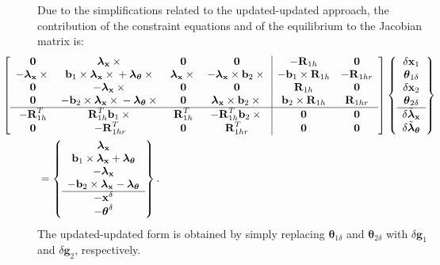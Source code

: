 \documentclass[10pt,dvips,fleqn,subeqn]{report}
\newcommand{\T}[1]{\bm{\mathbf{#1}}}
\begin{document}
Due to the simplifications related to the updated-updated approach,
the contribution of the constraint equations and of the equilibrium 
to the Jacobian matrix is: 
\begin{align}
	\small
	&\hspace{-12mm}%
	\sqbr{\matr{cccc|cc}{
	\T{0} & 
	\T{\lambda}_{\T{x}}\times{} & 
	\T{0} & 
	\T{0} & 
	-\T{R}_{1h} &
	\T{0} \\
	-\T{\lambda}_{\T{x}}\times{} & 
	\T{b}_1\times\T{\lambda}_{\T{x}}\times{} + \T{\lambda}_{\T{\theta}}\times{} &
	\T{\lambda}_{\T{x}}\times{} & 
	-\T{\lambda}_{\T{x}}\times\T{b}_2\times{} & 
	-\T{b}_1\times\T{R}_{1h} &
	-\T{R}_{1hr} \\
	\T{0} & 
	-\T{\lambda}_{\T{x}}\times{} &
	\T{0} &
	\T{0} &
	\T{R}_{1h} &
	\T{0} \\
	\T{0} & 
	-\T{b}_2\times\T{\lambda}_{\T{x}}\times{} - \T{\lambda}_{\T{\theta}}\times{} &
	\T{0} &
	\T{\lambda}_{\T{x}}\times\T{b}_2\times{} &
	\T{b}_2\times\T{R}_{1h} & 
	\T{R}_{1hr} \\
	\hline
	-\T{R}_{1h}^T &
	\T{R}_{1h}^T\T{b}_1\times{} & 
	\T{R}_{1h}^T &
	-\T{R}_{1h}^T\T{b}_2\times{} & 
	\T{0} &
	\T{0} \\
	\T{0} &
	-\T{R}_{1hr}^T &
	\T{0} &
	\T{R}_{1hr}^T &
	\T{0} & 
	\T{0}
	}} \cubr{\cvvect{
		\delta\T{x}_1 \\
		\T{\theta}_{1\delta} \\
		\delta\T{x}_2 \\
		\T{\theta}_{2\delta} \\
		\hline
		\delta\tilde{\T{\lambda}}_{\T{x}} \\
		\delta\tilde{\T{\lambda}}_{\T{\theta}}
	}} \nonumber \\
	&= \cubr{\cvvect{
	\T{\lambda}_{\T{x}} \\
	\T{b}_1 \times \T{\lambda}_{\T{x}} + \T{\lambda}_{\T{\theta}} \\
	- \T{\lambda}_{\T{x}} \\
	- \T{b}_2 \times \T{\lambda}_{\T{x}} - \T{\lambda}_{\T{\theta}} \\
	\hline
	- \T{x}^{\delta} \\
	- \T{\theta}^{\delta}
	}} .
\end{align}
The updated-updated form is obtained by simply replacing
$\T{\theta}_{1\delta}$ and $\T{\theta}_{2\delta}$
with $\delta\T{g}_1$ and $\delta\T{g}_2$, respectively.
\end{document}
